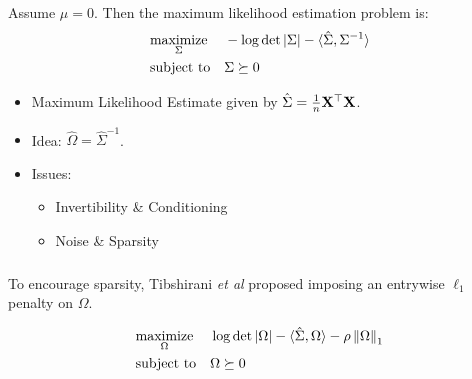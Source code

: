\begin{frame}[fragile] \frametitle{}
\end{frame}
\begin{frame}[fragile] \frametitle{}
    \vspace{0.5cm}

    Assume $\mu = 0$.  Then the maximum likelihood estimation problem is:
	\begin{align*}
		&\underset{\Sigma}{\text{maximize}} && 
			-\log\det|\Sigma| - \langle \hat\Sigma, \Sigma^{-1} \rangle
		\\ &\text{subject to} && \Sigma \succeq 0
	\end{align*}
    \vspace{-0.8cm}
    \begin{itemize}
        \item Maximum Likelihood Estimate given by $\hat\Sigma = 
            \frac{1}{n} \mathbf{X}^\top \mathbf{X}$.
        \item Idea: $\hat\Omega = \hat\Sigma^{-1}$.
        \item Issues:
            \begin{itemize}
                \item Invertibility \& Conditioning
                \item Noise \& Sparsity
            \end{itemize}
    \end{itemize}
\end{frame}
\begin{frame}[fragile] \frametitle{}

    \vspace{0.6cm}
    To encourage sparsity, Tibshirani \textit{et al} proposed imposing an
    entrywise $\ell_1$ penalty on $\Omega$.

    \begin{align*}
        &\underset{\Omega}{\text{maximize}} && 
            \log\det|\Omega| - \langle \hat\Sigma, \Omega \rangle
            - \rho \left\lVert\Omega\right\rVert_1
        \\ &\text{subject to} && \Omega \succeq 0
    \end{align*}
\end{frame}
